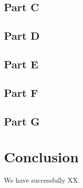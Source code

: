 \documentclass[a4paper, 11pt]{article}
\begin{document}
\subsection{Part C}
\subsection{Part D}
\subsection{Part E}
\subsection{Part F}
\subsection{Part G}

\pagebreak

\section{Conclusion}

We have successfully XX.


\end{document}
